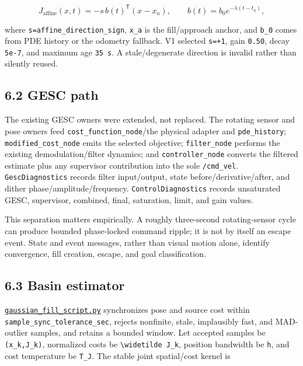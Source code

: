 \documentclass[
  10pt,
  letterpaper,
]{article}
\begin{document}
\[
J_{\mathrm{affine}}(x,t)=-s\,b(t)^\mathsf{T}(x-x_a),
\qquad b(t)=b_0e^{-\lambda(t-t_a)},
\]

where \nolinkurl{s=affine\_direction\_sign}, \nolinkurl{x\_a} is the fill/approach anchor, and \nolinkurl{b\_0}
comes from PDE history or the odometry fallback. V1 selected \nolinkurl{s=+1}, gain
\nolinkurl{0.50}, decay \nolinkurl{5e-7}, and maximum age \texttt{35 s}. A stale/degenerate direction is
invalid rather than silently reused.

\subsection{6.2 GESC path}\label{gesc-path}

The existing GESC owners were extended, not replaced. The rotating sensor and
pose owners feed \nolinkurl{cost\_function\_node}/the physical adapter and \nolinkurl{pde\_history};
\nolinkurl{modified\_cost\_node} emits the selected objective; \nolinkurl{filter\_node} performs the
existing demodulation/filter dynamics; and \nolinkurl{controller\_node} converts the
filtered estimate plus any supervisor contribution into the sole \nolinkurl{/cmd\_vel}.
\nolinkurl{GescDiagnostics} records filter input/output, state before/derivative/after,
and dither phase/amplitude/frequency. \nolinkurl{ControlDiagnostics} records unsaturated
GESC, supervisor, combined, final, saturation, limit, and gain values.

This separation matters empirically. A roughly three-second rotating-sensor
cycle can produce bounded phase-locked command ripple; it is not by itself an
escape event. State and event messages, rather than visual motion alone,
identify convergence, fill creation, escape, and goal classification.

\subsection{6.3 Basin estimator}\label{basin-estimator}

\href{../../../ros2_ws/src/ros_esc/ros_esc/gaussian_fill_node/gaussian_fill_script.py}{\nolinkurl{gaussian\_fill\_script.py}}
synchronizes pose and source cost within \nolinkurl{sample\_sync\_tolerance\_sec}, rejects
nonfinite, stale, implausibly fast, and MAD-outlier samples, and retains a
bounded window. Let accepted samples be \nolinkurl{(x\_k,J\_k)}, normalized costs be
\texttt{\textbackslash widetilde J\_k}, position bandwidth be \nolinkurl{h}, and cost temperature be \nolinkurl{T\_J}.
The stable joint spatial/cost kernel is
\end{document}
